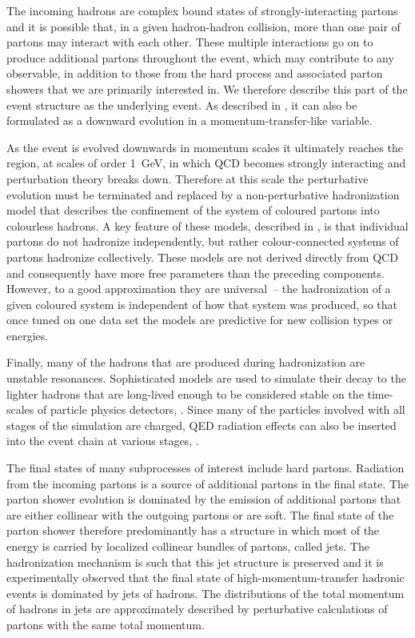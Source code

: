 The incoming hadrons are complex bound states of strongly-interacting
partons and it is possible that, in a given hadron-hadron collision,
more than one pair of partons may interact with each other.  These
multiple interactions go on to produce additional partons throughout the
event, which may contribute to any observable, in addition to those from
the hard process and associated parton showers that we are primarily
interested in.  We therefore describe this part of the event structure
as the underlying event.  As described in
, it can also be formulated as a downward
evolution in a momentum-transfer-like variable.

As the event is evolved downwards in momentum scales it ultimately
reaches the region, at scales of order 1~GeV, in which QCD becomes
strongly interacting and perturbation theory breaks down.  Therefore at
this scale the perturbative evolution must be terminated and replaced by
a non-perturbative hadronization model that describes the confinement of the system of
coloured partons into colourless hadrons. A key feature of these
models, described in ,  is that individual
partons do not hadronize independently, but rather colour-connected
systems of partons hadronize collectively.  These models are not
derived directly from QCD and consequently have more free parameters
than the preceding components.  However, to a good approximation
they are universal~-- the hadronization of a given coloured system is
independent of how that system was produced, so that once tuned on one
data set the models are predictive for new collision types or energies.

Finally, many of the hadrons that are produced during hadronization are
unstable resonances.  Sophisticated models are used to simulate their
decay to the lighter hadrons that are long-lived enough to be considered
stable on the time-scales of particle physics detectors,
.  Since many of the particles involved with
all stages of the simulation are charged, QED radiation effects can also
be inserted into the event chain at various stages,
.


The final states of many subprocesses of interest include hard partons.
Radiation from the incoming partons is a source of additional partons in
the final state.  The parton shower evolution is dominated by the
emission of additional partons that are either collinear with the
outgoing partons or are soft.  The final state of the parton shower
therefore predominantly has a structure in which most of the energy is
carried by localized collinear bundles of partons, called jets.  The
hadronization mechanism is such that this jet structure is preserved and
it is experimentally observed that the final state of
high-momentum-transfer hadronic events is
dominated by jets of hadrons.  The distributions of the total momentum
of hadrons in jets are approximately described by perturbative
calculations of partons with the same total momentum.

